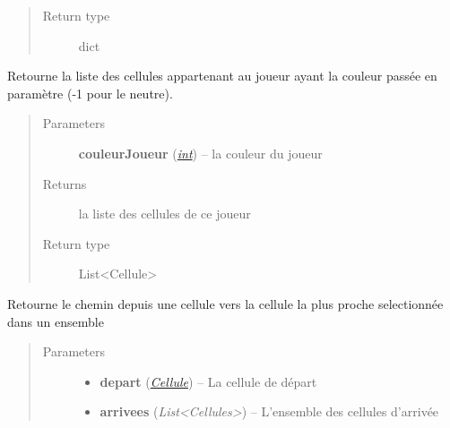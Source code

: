 \documentclass[letterpaper,10pt,english]{sphinxmanual}
\begin{document}
\begin{fulllineitems}
\begin{fulllineitems}
\begin{quote}
\begin{description}
\item[{Return type}] \leavevmode
dict

\end{description}\end{quote}

\end{fulllineitems}


\begin{fulllineitems}
\label{index:Terrain.Terrain.getCellulesJoueur}
Retourne la liste des cellules appartenant au joueur ayant la couleur passée en paramètre (-1 pour le neutre).
\begin{quote}\begin{description}
\item[{Parameters}] \leavevmode
\textbf{couleurJoueur} (\href{http://docs.python.org/library/functions.html\#int}{\emph{int}}) -- la couleur du joueur

\item[{Returns}] \leavevmode
la liste des cellules de ce joueur

\item[{Return type}] \leavevmode
List\textless{}Cellule\textgreater{}

\end{description}\end{quote}

\end{fulllineitems}


\begin{fulllineitems}
\label{index:Terrain.Terrain.getCheminVersCellulePlusProche}
Retourne le chemin depuis une cellule vers la cellule la plus proche selectionnée dans un ensemble
\begin{quote}\begin{description}
\item[{Parameters}] \leavevmode\begin{itemize}
\item {} 
\textbf{depart} ({\hyperref[index:module-Cellule]{\emph{Cellule}}}) -- La cellule de départ

\item {} 
\textbf{arrivees} (\emph{List\textless{}Cellules\textgreater{}}) -- L'ensemble des cellules d'arrivée


\end{itemize}
\end{description}
\end{quote}
\end{fulllineitems}
\end{fulllineitems}
\end{document}
